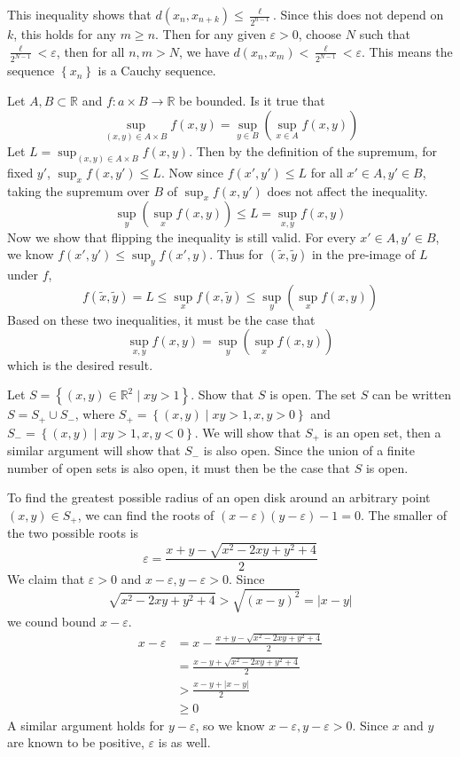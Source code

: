 \documentclass[10pt]{amsart}
\theoremstyle{plain}
\newenvironment{exercise}[1]{%
  \renewcommand\themanualtheoreminner{#1}%
  \manualtheoreminner
}{\endmanualtheoreminner}
\theoremstyle{definition}
\newcommand{\<}{\langle}
\renewcommand{\>}{\rangle}
\begin{document}
This inequality shows that $d(x_{n}, x_{n+k}) \leq \frac{\ell}{2^{n-1}} $.
Since this does not depend on $ k$, this holds for any $m \geq n$. Then for any given $\varepsilon > 0$, choose $N$ such that $\frac{\ell}{2^{N-1}} < \varepsilon$, then for all $n,m > N$, we have $d(x_n, x_m) < \frac{\ell}{2^{N-1}} < \varepsilon$. This means the sequence $\left\{ x_n \right\}$ is a Cauchy sequence.

\begin{exercise}{1.31}
	Let $A,B \subset \mathbb{R}$ and $f:a\times B \to \mathbb{R}$ be bounded. Is it true that
	\[
		\sup_{(x,y) \in A \times B} f(x,y) = \sup_{y\in B} \left( \sup_{x \in A}f(x,y) \right)
	\] 
\end{exercise}
Let $L = \sup_{(x,y) \in A \times B} f(x,y)$. Then by the definition of the supremum, for fixed $y'$, $\sup_x f(x,y') \leq L$. Now since $f(x',y') \leq L$ for all $x' \in A, y' \in B$, taking the supremum over $B$ of $\sup_x f(x,y')$ does not affect the inequality.
\[
	\sup_y \left( \sup_x f(x,y) \right) \leq L = \sup_{x,y} f(x,y)
\] 
Now we show that flipping the inequality is still valid. For every $x' \in A, y' \in B$, we know $f(x',y') \leq \sup_y f(x',y)$. Thus for $(\tilde{x}, \tilde{y})$ in the pre-image of $L$ under $f$,
\[
	f(\tilde{x},\tilde{y}) = L \leq \sup_x f(x,\tilde{y}) \leq \sup_y \left( \sup_x f(x,y) \right)
\] 
Based on these two inequalities, it must be the case that
\[
	\sup_{x,y} f(x,y) = \sup_y \left( \sup_x f(x,y) \right)
\] 
which is the desired result.

\begin{exercise}{2.1.2}
	Let $S=\left\{ (x,y) \in \mathbb{R}^2 \;|\; xy > 1 \right\}$. Show that $S$ is open.
\end{exercise}
The set $S$ can be written $S = S_+ \cup S_-$, where $S_+ = \left\{ (x,y) \;|\; xy>1, x,y>0 \right\}$ and $S_- = \left\{ (x,y) \;|\; xy>1, x,y<0 \right\}$. We will show that $S_+$ is an open set, then a similar argument will show that $S_-$ is also open. Since the union of a finite number of open sets is also open, it must then be the case that $S$ is open.

To find the greatest possible radius of an open disk around an arbitrary point $(x,y) \in S_+$, we can find the roots of $(x-\varepsilon)(y-\varepsilon) -1 = 0$. The smaller of the two possible roots is
\[
\varepsilon = \frac{x+y-\sqrt{x^2 -2xy+y^2+4}}{2} 
\]
We claim that $\varepsilon>0$ and $x-\varepsilon,y-\varepsilon>0$. Since
\[
	\sqrt{x^2 - 2xy + y^2 + 4} > \sqrt{(x-y)^2} = |x-y|
\]
we cound bound $x-\varepsilon$.
\begin{align*}
	x-\varepsilon &= x - \frac{x+y-\sqrt{x^2 -2xy+y^2+4}}{2} \\
		      &= \frac{x-y+\sqrt{x^2 -2xy+y^2+4}}{2} \\
		      &> \frac{x-y+|x-y|}{2} \\
		      &\geq 0
\end{align*}
A similar argument holds for $y-\varepsilon$, so we know $x-\varepsilon, y-\varepsilon>0$. Since $x$ and $y$ are known to be positive, $\varepsilon$ is as well.
\end{document}
